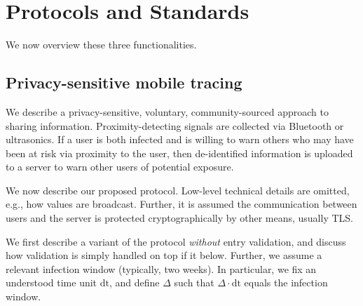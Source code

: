 \documentclass{article}
\begin{document}
\section{Protocols and Standards} 
We now overview these three functionalities.


\subsection{Privacy-sensitive mobile tracing} \label{sect:Bluetooth}

We describe a privacy-sensitive, voluntary, community-sourced approach to sharing information. 
Proximity-detecting signals are collected via Bluetooth or ultrasonics.  If a user is both infected and is willing to warn others who may have been at risk via proximity to the user, then de-identified information is uploaded to a server to warn other users of potential exposure. 


We now describe our proposed protocol. Low-level technical details are omitted, e.g., how values are broadcast. Further, it is assumed the communication between users and the server is protected cryptographically by other means, usually TLS. 


\newcommand{\id}{\mathrm{id}}
\newcommand{\dt}{\mathrm{dt}}
 We first describe a variant of the protocol {\em without} entry validation, and discuss how validation is simply handled on top if it below. Further, we assume a relevant infection window (typically, two weeks). In particular, we fix an understood time unit $\dt$, and define $\Delta$ such that $\Delta \cdot \dt$ equals the infection window.
\end{document}
